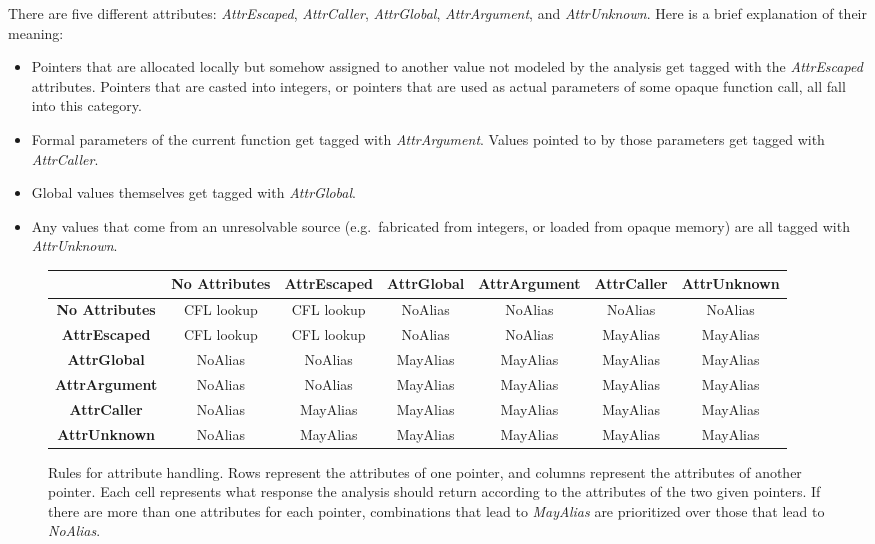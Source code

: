 \documentclass[10pt]{article}
\begin{document}
There are five different attributes: \emph{AttrEscaped}, \emph{AttrCaller},
\emph{AttrGlobal}, \emph{AttrArgument}, and \emph{AttrUnknown}. Here is a brief
explanation of their meaning:
\begin{itemize}
  \item Pointers that are allocated locally but somehow assigned to another value not
    modeled by the analysis get tagged with the \emph{AttrEscaped} attributes.
    Pointers that are casted into integers, or pointers that are used as actual
    parameters of some opaque function call, all fall into this category.
  \item Formal parameters of the current function get tagged with
    \emph{AttrArgument}. Values pointed to by those parameters get tagged with
    \emph{AttrCaller}.
  \item Global values themselves get tagged with \emph{AttrGlobal}.
  \item Any values that come from an unresolvable source (e.g.\ fabricated from
    integers, or loaded from opaque memory) are all tagged with
    \emph{AttrUnknown}. 
\end{itemize}

\begin{figure}\label{attrs}
\centering
\begin{tabular}{c|cccccc}
                       & \textbf{No Attributes} & \textbf{AttrEscaped} & \textbf{AttrGlobal} & \textbf{AttrArgument} & \textbf{AttrCaller} & \textbf{AttrUnknown} \\ \hline
\textbf{No Attributes} & CFL lookup             & CFL lookup           & NoAlias             & NoAlias             & NoAlias               & NoAlias              \\
\textbf{AttrEscaped}   & CFL lookup             & CFL lookup           & NoAlias            & NoAlias             & MayAlias               & MayAlias             \\
\textbf{AttrGlobal}    & NoAlias                & NoAlias              & MayAlias            & MayAlias            & MayAlias              & MayAlias             \\
\textbf{AttrArgument}  & NoAlias                & NoAlias              & MayAlias            & MayAlias            & MayAlias              & MayAlias             \\
\textbf{AttrCaller}    & NoAlias                & MayAlias             & MayAlias            & MayAlias            & MayAlias              & MayAlias             \\
\textbf{AttrUnknown}   & NoAlias                & MayAlias             & MayAlias            & MayAlias            & MayAlias              & MayAlias            
\end{tabular}
\caption{Rules for attribute handling. Rows represent the attributes of one
  pointer, and columns represent the attributes of another pointer. Each cell
  represents what response the analysis should return according to the
  attributes of the two given pointers. If there are more than one attributes
  for each pointer, combinations that lead to \emph{MayAlias} are prioritized
  over those that lead to \emph{NoAlias}. }
\end{figure}
\end{document}
